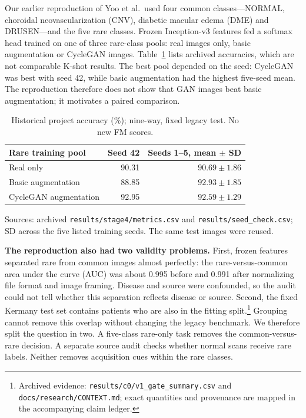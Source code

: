 \documentclass[conference]{IEEEtran}
\newcommand{\claim}[1]{} %
\begin{document}
\claim{C02}
Our earlier reproduction of Yoo et al.\ used four common classes---NORMAL, choroidal neovascularization (CNV), diabetic macular edema (DME) and DRUSEN---and the five rare classes. Frozen Inception-v3 features fed a softmax head trained on one of three rare-class pools: real images only, basic augmentation or CycleGAN images. Table~\ref{tab:history} lists archived accuracies, which are not comparable K-shot results. The best pool depended on the seed: CycleGAN was best with seed 42, while basic augmentation had the highest five-seed mean. The reproduction therefore does not show that GAN images beat basic augmentation; it motivates a paired comparison.

\begin{table}[t]
\caption{Historical project accuracy (\%); nine-way, fixed legacy test. No new FM scores.}
\label{tab:history}
\centering
\begin{tabular}{lrr}
\toprule
Rare training pool & Seed 42 & Seeds 1--5, mean $\pm$ SD\\
\midrule
Real only & 90.31 & $90.69\pm1.86$\\
Basic augmentation & 88.85 & $92.93\pm1.85$\\
CycleGAN augmentation & 92.95 & $92.59\pm1.29$\\
\bottomrule
\end{tabular}
\par\smallskip
\parbox{\columnwidth}{\footnotesize Sources: archived \texttt{results/stage4/metrics.csv} and \texttt{results/seed\_check.csv}; SD across the five listed training seeds. The same test images were reused.}
\end{table}

\claim{C03}
\textbf{The reproduction also had two validity problems.} First, frozen features separated rare from common images almost perfectly: the rare-versus-common area under the curve (AUC) was about 0.995 before and 0.991 after normalizing file format and image framing. Disease and source were confounded, so the audit could not tell whether this separation reflects disease or source. Second, the fixed Kermany test set contains patients who are also in the fitting split.\footnote{Archived evidence: \texttt{results/c0/v1\_gate\_summary.csv} and \texttt{docs/research/CONTEXT.md}; exact quantities and provenance are mapped in the accompanying claim ledger.} Grouping cannot remove this overlap without changing the legacy benchmark. We therefore split the question in two. A five-class rare-only task removes the common-versus-rare decision. A separate source audit checks whether normal scans receive rare labels. Neither removes acquisition cues within the rare classes.
\end{document}
